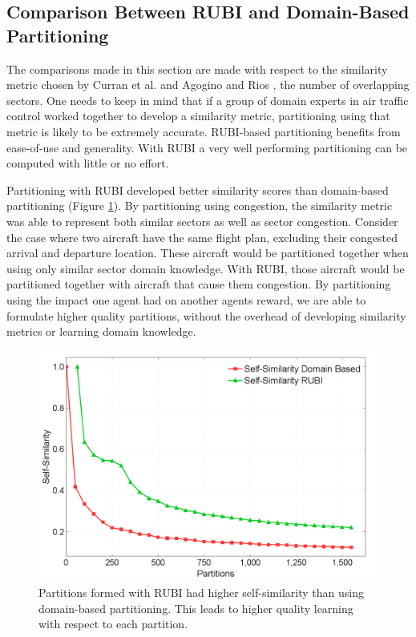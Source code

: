\documentclass[letterpaper]{article}
\begin{document}



\subsection{Comparison Between RUBI and Domain-Based Partitioning}

The comparisons made in this section are made with respect to the similarity metric chosen by Curran et al. \cite{Curran:2013:AHC:2484920.2485183} and Agogino and Rios \cite{Agogino:2009:EEM:1570256.1570258,Rios}, the number of overlapping sectors. One needs to keep in mind that if a group of domain experts in air traffic control worked together to develop a similarity metric, partitioning using that metric is likely to be extremely accurate. RUBI-based partitioning benefits from ease-of-use and generality. With RUBI a very well performing partitioning can be computed with little or no effort.

Partitioning with RUBI developed better similarity scores than domain-based partitioning (Figure \ref{Self-SimOldvsSelf-SimNew}). By partitioning using congestion, the similarity metric was able to represent both similar sectors as well as sector congestion. Consider the case where two aircraft have the same flight plan, excluding their congested arrival and departure location. These aircraft would be partitioned together when using only similar sector domain knowledge. With RUBI, those aircraft would be partitioned together with aircraft that cause them congestion. By partitioning using the impact one agent had on another agents reward, we are able to formulate higher quality partitions, without the overhead of developing similarity metrics or learning domain knowledge.

\begin{figure}
\centering
\includegraphics[width=1.0\columnwidth]{Self-SimOldvsSelf-SimNew}
\caption{Partitions formed with RUBI had higher self-similarity than using domain-based partitioning. This leads to higher quality learning with respect to each partition.}
\label{Self-SimOldvsSelf-SimNew}
\end{figure}
\end{document}
